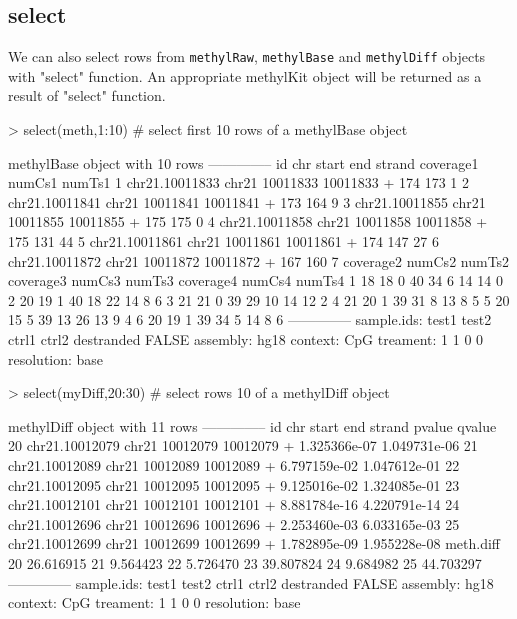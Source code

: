 \documentclass{article}
\begin{document}
\subsection{select}

We can also select rows from \texttt{methylRaw}, \texttt{methylBase} and \texttt{methylDiff} objects with "select" function. An appropriate methylKit object will be returned as a result of "select" function. 
\begin{Schunk}
\begin{Sinput}
> select(meth,1:10) # select first 10 rows of a methylBase object
\end{Sinput}
\begin{Soutput}
methylBase object with 10 rows
--------------
              id   chr    start      end strand coverage1 numCs1 numTs1
1 chr21.10011833 chr21 10011833 10011833      +       174    173      1
2 chr21.10011841 chr21 10011841 10011841      +       173    164      9
3 chr21.10011855 chr21 10011855 10011855      +       175    175      0
4 chr21.10011858 chr21 10011858 10011858      +       175    131     44
5 chr21.10011861 chr21 10011861 10011861      +       174    147     27
6 chr21.10011872 chr21 10011872 10011872      +       167    160      7
  coverage2 numCs2 numTs2 coverage3 numCs3 numTs3 coverage4 numCs4 numTs4
1        18     18      0        40     34      6        14     14      0
2        20     19      1        40     18     22        14      8      6
3        21     21      0        39     29     10        14     12      2
4        21     20      1        39     31      8        13      8      5
5        20     15      5        39     13     26        13      9      4
6        20     19      1        39     34      5        14      8      6
--------------
sample.ids: test1 test2 ctrl1 ctrl2 
destranded FALSE 
assembly: hg18 
context: CpG 
treament: 1 1 0 0 
resolution: base 
\end{Soutput}
\begin{Sinput}
> select(myDiff,20:30) # select rows 10 of a methylDiff object
\end{Sinput}
\begin{Soutput}
methylDiff object with 11 rows
--------------
               id   chr    start      end strand       pvalue       qvalue
20 chr21.10012079 chr21 10012079 10012079      + 1.325366e-07 1.049731e-06
21 chr21.10012089 chr21 10012089 10012089      + 6.797159e-02 1.047612e-01
22 chr21.10012095 chr21 10012095 10012095      + 9.125016e-02 1.324085e-01
23 chr21.10012101 chr21 10012101 10012101      + 8.881784e-16 4.220791e-14
24 chr21.10012696 chr21 10012696 10012696      + 2.253460e-03 6.033165e-03
25 chr21.10012699 chr21 10012699 10012699      + 1.782895e-09 1.955228e-08
   meth.diff
20 26.616915
21  9.564423
22  5.726470
23 39.807824
24  9.684982
25 44.703297
--------------
sample.ids: test1 test2 ctrl1 ctrl2 
destranded FALSE 
assembly: hg18 
context: CpG 
treament: 1 1 0 0 
resolution: base 
\end{Soutput}
\end{Schunk}
\end{document}
